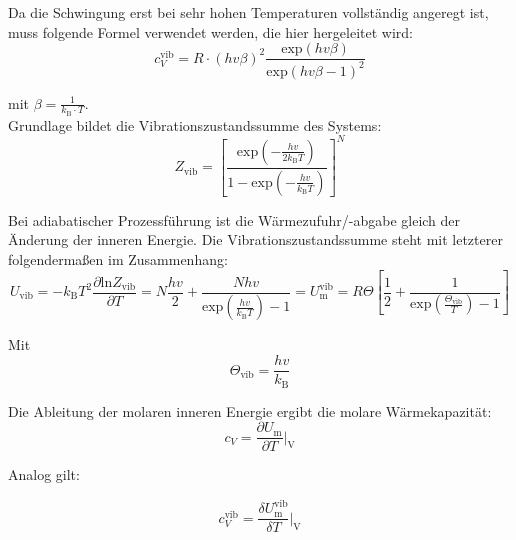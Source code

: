 \documentclass[a4paper,12pt,oneside,onecolum,final,openany]{report}
\begin{document}
Da die Schwingung erst bei sehr hohen Temperaturen vollständig angeregt ist, muss folgende Formel verwendet werden, die hier hergeleitet wird: \\


\begin{equation}
c_V^\mathrm{ vib} = R\cdot(hv\beta)^2 \frac{\mathrm{exp}(hv\beta)}{\mathrm{exp}(hv\beta -1)^2} \label{cvviblangeFormel}
\end{equation}


mit $\beta=\frac{1}{k_\mathrm{B} \cdot T}$.\\

Grundlage bildet die Vibrationszustandssumme des Systems:\\

\begin{equation}
Z_\mathrm{vib}= \left[\frac{\mathrm{exp}(-\frac{hv}{2k_\mathrm{B}T})}{1-\mathrm{exp}(-\frac{hv}{k_\mathrm{B}T})}\right]^N
\end{equation}

Bei adiabatischer Prozessführung ist die Wärmezufuhr/-abgabe gleich der Änderung der inneren Energie. Die Vibrationszustandssumme steht mit letzterer folgendermaßen im Zusammenhang:\\

\begin{equation}
U_\mathrm{vib}= -k_\mathrm{B}T^2 \frac{\partial \mathrm{ln}Z_\mathrm{vib}}{\partial T} = N\frac{hv}{2} +\frac{Nhv}{\mathrm{exp}\left(\frac{hv}{k_\mathrm{B}T}\right)-1}= U_\mathrm{m}^\mathrm{vib} = R \Theta \left[ \frac{1}{2} + \frac{1}{\mathrm{exp}(\frac{\Theta_\mathrm{vib}}{T}) -1}\right]
\end{equation}

Mit\\

\begin{equation}
\Theta_\mathrm{vib} = \frac{hv}{k_\mathrm{B}}
\end{equation}


Die Ableitung der molaren inneren Energie ergibt die molare Wärmekapazität:\\


\begin{equation}
c_V = \frac{\partial U_\mathrm{m}}{\partial T}\bigg \vert_\mathrm{V}
\end{equation}

Analog gilt:

\begin{equation}
c_V^\mathrm{vib} = \frac{\delta U_\mathrm{m}^\mathrm{vib}}{\delta T}\bigg \vert_\mathrm{V}
\end{equation}
\end{document}
